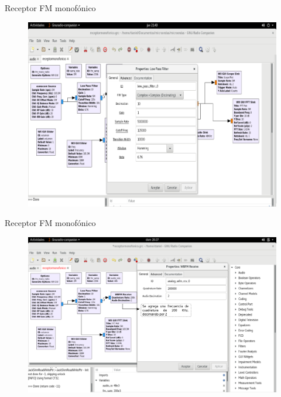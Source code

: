 \begin{frame}{Receptor FM monofónico}

\begin{figure}[H]
\centering
\vspace{-3mm}
\includegraphics[width=\textwidth]{parte3/lab8/pdf/lab8_4.pdf}
\end{figure}

\end{frame}

\begin{frame}{Receptor FM monofónico}

\begin{figure}[H]
\centering
\vspace{-3mm}
\includegraphics[width=\textwidth]{parte3/lab8/pdf/lab8_5.pdf}
\end{figure}

\end{frame}


